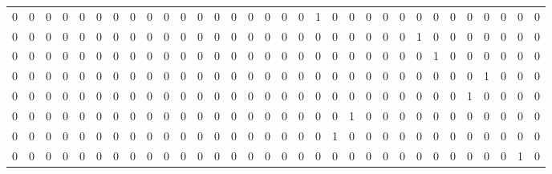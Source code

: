 \begin{tabular}{rrrrrrrrrrrrrrrrrrrrrrrrrrrrrrrr}
       0 &       0 &       0 &       0 &       0 &       0 &       0 &       0 &       0 &       0 &       0 &       0 &       0 &       0 &       0 &       0 &       0 &       0 &       1 &       0 &       0 &       0 &       0 &       0 &       0 &       0 &       0 &       0 &       0 &       0 &       0 &       0 \\
       0 &       0 &       0 &       0 &       0 &       0 &       0 &       0 &       0 &       0 &       0 &       0 &       0 &       0 &       0 &       0 &       0 &       0 &       0 &       0 &       0 &       0 &       0 &       0 &       1 &       0 &       0 &       0 &       0 &       0 &       0 &       0 \\
       0 &       0 &       0 &       0 &       0 &       0 &       0 &       0 &       0 &       0 &       0 &       0 &       0 &       0 &       0 &       0 &       0 &       0 &       0 &       0 &       0 &       0 &       0 &       0 &       0 &       1 &       0 &       0 &       0 &       0 &       0 &       0 \\
       0 &       0 &       0 &       0 &       0 &       0 &       0 &       0 &       0 &       0 &       0 &       0 &       0 &       0 &       0 &       0 &       0 &       0 &       0 &       0 &       0 &       0 &       0 &       0 &       0 &       0 &       0 &       0 &       1 &       0 &       0 &       0 \\
       0 &       0 &       0 &       0 &       0 &       0 &       0 &       0 &       0 &       0 &       0 &       0 &       0 &       0 &       0 &       0 &       0 &       0 &       0 &       0 &       0 &       0 &       0 &       0 &       0 &       0 &       0 &       1 &       0 &       0 &       0 &       0 \\
       0 &       0 &       0 &       0 &       0 &       0 &       0 &       0 &       0 &       0 &       0 &       0 &       0 &       0 &       0 &       0 &       0 &       0 &       0 &       0 &       1 &       0 &       0 &       0 &       0 &       0 &       0 &       0 &       0 &       0 &       0 &       0 \\
       0 &       0 &       0 &       0 &       0 &       0 &       0 &       0 &       0 &       0 &       0 &       0 &       0 &       0 &       0 &       0 &       0 &       0 &       0 &       1 &       0 &       0 &       0 &       0 &       0 &       0 &       0 &       0 &       0 &       0 &       0 &       0 \\
       0 &       0 &       0 &       0 &       0 &       0 &       0 &       0 &       0 &       0 &       0 &       0 &       0 &       0 &       0 &       0 &       0 &       0 &       0 &       0 &       0 &       0 &       0 &       0 &       0 &       0 &       0 &       0 &       0 &       0 &       1 &       0 \\

\end{tabular}
